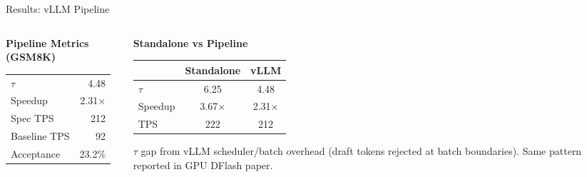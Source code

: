 \documentclass[10pt]{beamer}
\begin{document}
\begin{frame}{Results: vLLM Pipeline}
\begin{columns}[T]
\begin{column}{0.45\textwidth}
\textbf{Pipeline Metrics (GSM8K)}
\vspace{0.3em}

\footnotesize
\begin{tabular}{lr}
\toprule
$\tau$ & 4.48 \\
Speedup & 2.31$\times$ \\
Spec TPS & 212 \\
Baseline TPS & 92 \\
Acceptance & 23.2\% \\
\bottomrule
\end{tabular}
\end{column}
\begin{column}{0.52\textwidth}
\textbf{Standalone vs Pipeline}
\vspace{0.3em}

\footnotesize
\begin{tabular}{lcc}
\toprule
& Standalone & vLLM \\
\midrule
$\tau$ & 6.25 & 4.48 \\
Speedup & 3.67$\times$ & 2.31$\times$ \\
TPS & 222 & 212 \\
\bottomrule
\end{tabular}

\vspace{0.5em}
\footnotesize
$\tau$ gap from vLLM scheduler/batch overhead (draft tokens rejected at batch boundaries). Same pattern reported in GPU DFlash paper.
\end{column}
\end{columns}
\end{frame}
\end{document}
